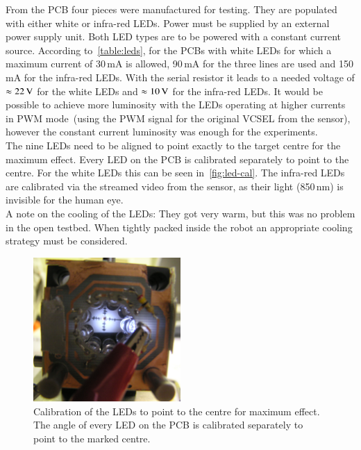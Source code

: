 \documentclass[12pt,a4paper]{article}
\begin{document}
From the PCB four pieces were manufactured for testing.
They are populated with either white or infra-red LEDs.
Power must be supplied by an external power supply unit.
Both LED types are to be powered with a constant current source.
According to~\autoref{table:leds}, for the PCBs with white LEDs for which a maximum current of 30\,mA is allowed, 90\,mA for the three lines are used and 150\,mA for the infra-red LEDs.
With the serial resistor it leads to a needed voltage of $\approx\unit[22]{V}$ for the white LEDs and $\approx\unit[10]{V}$ for the infra-red LEDs.
It would be possible to achieve more luminosity with the LEDs operating at higher currents in PWM mode~(using the PWM signal for the original VCSEL from the sensor), however the constant current luminosity was enough for the experiments.\\
The nine LEDs need to be aligned to point exactly to the target centre for the maximum effect.
Every LED on the PCB is calibrated separately to point to the centre.
For the white LEDs this can be seen in~\autoref{fig:led-cal}.
The infra-red LEDs are calibrated via the streamed video from the sensor, as their light (850\,nm) is invisible for the human eye.\\
A note on the cooling of the LEDs: They got very warm, but this was no problem in the open testbed.
When tightly packed inside the robot an appropriate cooling strategy must be considered.

\begin{figure}[htbp]
\begin{center}
\includegraphics[width=0.5\textwidth]{figures/led-centre-cal.png}
\caption{\label{fig:led-cal}
Calibration of the LEDs to point to the centre for maximum effect.
The angle of every LED on the PCB is calibrated separately to point to the marked centre.
}
\end{center}
\end{figure}
\end{document}
